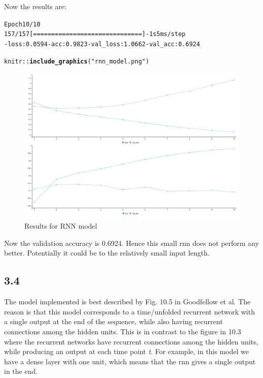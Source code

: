 \documentclass[10pt, a4paper, english]{article}\usepackage[]{graphicx}\usepackage[dvipsnames]{xcolor}
\makeatletter
\def\maxwidth{ %
  \ifdim\Gin@nat@width>\linewidth
    \linewidth
  \else
    \Gin@nat@width
  \fi
}
\newcommand{\hlstr}[1]{\textcolor[rgb]{0.192,0.494,0.8}{#1}}%
\newcommand{\hlopt}[1]{\textcolor[rgb]{0,0,0}{#1}}%
\newcommand{\hlstd}[1]{\textcolor[rgb]{0.345,0.345,0.345}{#1}}%
\newcommand{\hlkwd}[1]{\textcolor[rgb]{0.737,0.353,0.396}{\textbf{#1}}}%
\newenvironment{kframe}{%
 \def\at@end@of@kframe{}%
 \ifinner\ifhmode%
  \def\at@end@of@kframe{\end{minipage}}%
  \begin{minipage}{\columnwidth}%
 \fi\fi%
 \def\FrameCommand##1{\hskip\@totalleftmargin \hskip-\fboxsep
 \colorbox{shadecolor}{##1}\hskip-\fboxsep
     \hskip-\linewidth \hskip-\@totalleftmargin \hskip\columnwidth}%
 \MakeFramed {\advance\hsize-\width
   \@totalleftmargin\z@ \linewidth\hsize
   \@setminipage}}%
 {\par\unskip\endMakeFramed%
 \at@end@of@kframe}
\newenvironment{knitrout}{}{} %
\makeatother
\begin{document}
Now the results are:
\begin{knitrout}
\color{fgcolor}\begin{kframe}
\begin{alltt}
Epoch 10/10
157/157 [==============================] - 1s 5ms/step 
- loss: 0.0594 - acc: 0.9823 - val_loss: 1.0662 - val_acc: 0.6924
\end{alltt}
\end{kframe}
\end{knitrout}

\begin{knitrout}
\color{fgcolor}\begin{kframe}
\begin{alltt}
\hlstd{knitr}\hlopt{::}\hlkwd{include_graphics}\hlstd{(}\hlstr{"rnn_model.png"}\hlstd{)}
\end{alltt}
\end{kframe}\begin{figure}
\includegraphics[width=\maxwidth]{rnn_model} \caption[Results for RNN model]{Results for RNN model}\label{fig:unnamed-chunk-19}
\end{figure}

\end{knitrout}
Now the validation accuracy is 0.6924. Hence this small rnn does not perform any better. Potentially it could be to the relatively small input length. 


\subsection{3.4}
The model implemented is best described by Fig. 10.5 in Goodfellow et al. The reason is that this model corresponds to a time/unfolded recurrent network with a single output at the end of the sequence, while also having recurrent connections among the hidden units. 
This is in contrast to the figure in 10.3 where the recurrent networks have recurrent connections among the hidden units, while producing an output at each time point \emph{t}. For example, in this model we have a dense layer with one unit, which means that the rnn gives a single output in the end. 
\end{document}
